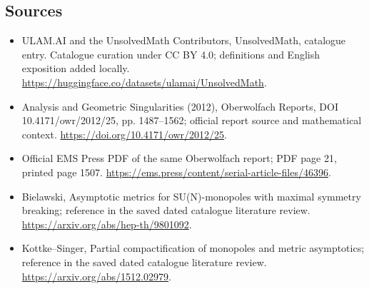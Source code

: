 \documentclass[11pt]{article}
\begin{document}
\subsection{Sources}
\begin{itemize}
\item[\hypertarget{source:statement:1}{S1}] ULAM.AI and the UnsolvedMath Contributors, UnsolvedMath, catalogue entry. Catalogue curation under CC BY 4.0; definitions and English exposition added locally.
\url{https://huggingface.co/datasets/ulamai/UnsolvedMath}.
\item[\hypertarget{source:statement:2}{S2}] Analysis and Geometric Singularities (2012), Oberwolfach Reports, DOI 10.4171/owr/2012/25, pp. 1487--1562; official report source and mathematical context.
\url{https://doi.org/10.4171/owr/2012/25}.
\item[\hypertarget{source:statement:3}{S3}] Official EMS Press PDF of the same Oberwolfach report; PDF page 21, printed page 1507.
\url{https://ems.press/content/serial-article-files/46396}.
\item[\hypertarget{source:statement:4}{S4}] Bielawski, Asymptotic metrics for SU(N)-monopoles with maximal symmetry breaking; reference in the saved dated catalogue literature review.
\url{https://arxiv.org/abs/hep-th/9801092}.
\item[\hypertarget{source:statement:5}{S5}] Kottke--Singer, Partial compactification of monopoles and metric asymptotics; reference in the saved dated catalogue literature review.
\url{https://arxiv.org/abs/1512.02979}.
\end{itemize}
\label{end:statement}
\end{document}
